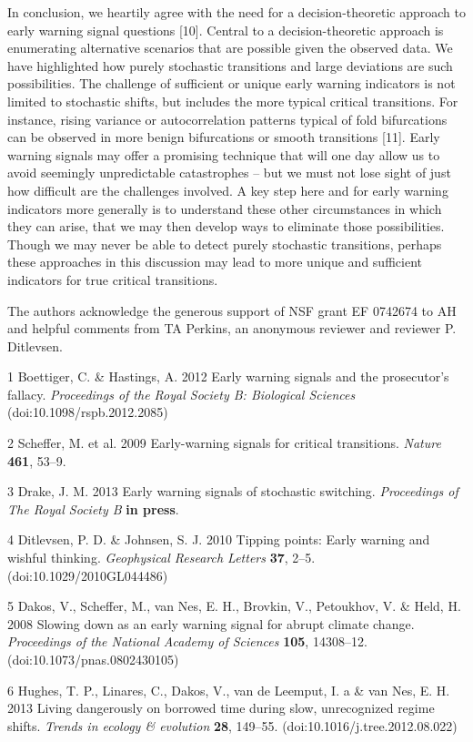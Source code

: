\documentclass{article}
\begin{document}
In conclusion, we heartily agree with the need for a decision-theoretic
approach to early warning signal questions {[}10{]}. Central to a
decision-theoretic approach is enumerating alternative scenarios that
are possible given the observed data. We have highlighted how purely
stochastic transitions and large deviations are such possibilities. The
challenge of sufficient or unique early warning indicators is not
limited to stochastic shifts, but includes the more typical critical
transitions. For instance, rising variance or autocorrelation patterns
typical of fold bifurcations can be observed in more benign bifurcations
or smooth transitions {[}11{]}. Early warning signals may offer a
promising technique that will one day allow us to avoid seemingly
unpredictable catastrophes -- but we must not lose sight of just how
difficult are the challenges involved. A key step here and for early
warning indicators more generally is to understand these other
circumstances in which they can arise, that we may then develop ways to
eliminate those possibilities. Though we may never be able to detect
purely stochastic transitions, perhaps these approaches in this
discussion may lead to more unique and sufficient indicators for true
critical transitions.

The authors acknowledge the generous support of NSF grant EF 0742674 to
AH and helpful comments from TA Perkins, an anonymous reviewer and
reviewer P. Ditlevsen.

1 Boettiger, C. \& Hastings, A. 2012 Early warning signals and the
prosecutor's fallacy. \emph{Proceedings of the Royal Society B:
Biological Sciences} (doi:10.1098/rspb.2012.2085)

2 Scheffer, M. et al. 2009 Early-warning signals for critical
transitions. \emph{Nature} \textbf{461}, 53--9.

3 Drake, J. M. 2013 Early warning signals of stochastic switching.
\emph{Proceedings of The Royal Society B} \textbf{in press}.

4 Ditlevsen, P. D. \& Johnsen, S. J. 2010 Tipping points: Early warning
and wishful thinking. \emph{Geophysical Research Letters} \textbf{37},
2--5. (doi:10.1029/2010GL044486)

5 Dakos, V., Scheffer, M., van Nes, E. H., Brovkin, V., Petoukhov, V. \&
Held, H. 2008 Slowing down as an early warning signal for abrupt climate
change. \emph{Proceedings of the National Academy of Sciences}
\textbf{105}, 14308--12. (doi:10.1073/pnas.0802430105)

6 Hughes, T. P., Linares, C., Dakos, V., van de Leemput, I. a \& van
Nes, E. H. 2013 Living dangerously on borrowed time during slow,
unrecognized regime shifts. \emph{Trends in ecology \& evolution}
\textbf{28}, 149--55. (doi:10.1016/j.tree.2012.08.022)
\end{document}
